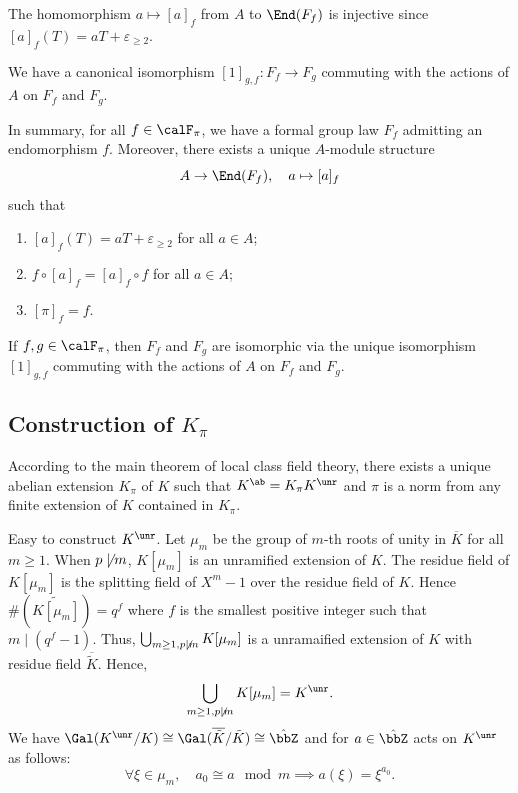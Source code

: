   \begin{remark}
    The homomorphism $a \mapsto [a]_f$ from $A$ to $\End(F_f)$ is injective since $[a]_f(T) = aT + \varepsilon_{\geq 2}$.
  \end{remark}

  \begin{remark}
    We have a canonical isomorphism $[1]_{g,f} : F_f \to F_g$ commuting with the actions of $A$ on $F_f$ and $F_g$.
  \end{remark}

  In summary, for all $f \in \calF_\pi$, we have a formal group law $F_f$ admitting an endomorphism $f$.
  Moreover, there exists a unique $A$-module structure 
  \[ A \to \End(F_f), \quad a \mapsto [a]_f \]
  such that 
  \begin{enumerate}
    \item $[a]_f(T) = aT + \varepsilon_{\geq 2}$ for all $a \in A$;
    \item $f \circ [a]_f = [a]_f \circ f$ for all $a \in A$;
    \item $[\pi]_f = f$.
  \end{enumerate}
  If $f,g \in \calF_\pi$, then $F_f$ and $F_g$ are isomorphic via the unique isomorphism $[1]_{g,f}$ commuting with the actions of $A$ on $F_f$ and $F_g$.


\subsection[Construction of K\_pi]{Construction of $K_\pi$}

  According to the main theorem of local class field theory, there exists a unique abelian extension $K_\pi$ of $K$ such that $K^\ab = K_\pi K^\unr$ and $\pi$ is a norm from any finite extension of $K$ contained in $K_\pi$.

  Easy to construct $K^\unr$.
  Let $\mu_m$ be the group of $m$-th roots of unity in $\overline{K}$ for all $m \geq 1$.
  When $p \not\mid m$, $K[\mu_m]$ is an unramified extension of $K$.
  The residue field of $K[\mu_m]$ is the splitting field of $X^m - 1$ over the residue field of $K$.
  Hence $\# (\tilde{K[\mu_m]}) = q^f$ where $f$ is the smallest positive integer such that $m \mid (q^f - 1)$.
  Thus, $\bigcup_{m \geq 1, p \not\mid m} K[\mu_m]$ is a unramaified extension of $K$ with residue field $\overline{\tilde{K}}$.
  Hence, 
  \[ \bigcup_{m \geq 1, p \not\mid m} K[\mu_m] = K^\unr. \]
  We have $\Gal(K^\unr/K) \cong \Gal(\overline{\tilde{K}}/\tilde{K}) \cong \hat{\bbZ}$ and for $a \in \hat{\bbZ}$ acts on $K^\unr$ as follows:
  \[ \forall \xi \in \mu_m, \quad a_0 \cong a \mod m \implies a(\xi) = \xi^{a_0}. \]

